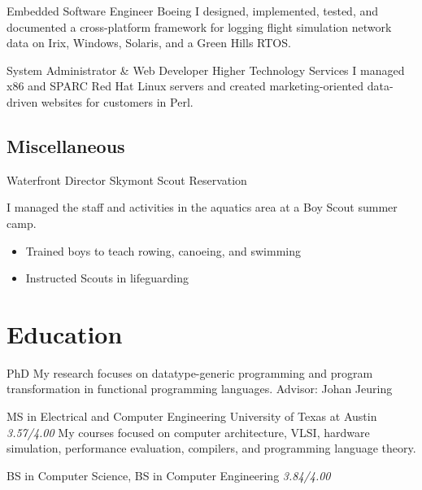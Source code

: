 \documentclass[11pt,a4paper,roman]{moderncv}
\begin{document}
\professionentry%
{}%
{Embedded Software Engineer}%
{Boeing}%
{\stlouis}%
{}%
{I designed, implemented, tested, and documented a cross-platform \cpplang{} framework for logging flight simulation network data on Irix, Windows, Solaris, and a Green Hills RTOS.}

\professionentry%
{}%
{System Administrator \& Web Developer}%
{Higher Technology Services}%
{\chattanooga}%
{}%
{I managed x86 and SPARC Red Hat Linux servers and created marketing-oriented data-driven websites for customers in Perl.}


\subsection{Miscellaneous}

\professionentry%
{}%
{Waterfront Director}%
{Skymont Scout Reservation}%
{\altamont}%
{}%
{I managed the staff and activities in the aquatics area at a Boy Scout summer camp.
\begin{itemize}[leftmargin=2em,nosep]
\item Trained boys to teach rowing, canoeing, and swimming
\item Instructed Scouts in lifeguarding
\end{itemize}}


\section{Education}

\educationentry%
{}%
{PhD}%
{\uu}%
{\utrecht}%
{My research focuses on datatype-generic programming and program transformation
in functional programming languages.\newline{}%
Advisor: Johan Jeuring}

\educationentrygpa%
{}%
{MS in Electrical and Computer Engineering}%
{University of Texas at Austin}%
{\austin}%
{\textit{3.57/4.00}}%
{My courses focused on computer architecture, VLSI, hardware simulation,
performance evaluation, compilers, and programming language theory.}

\educationentrygpa%
{}%
{BS in Computer Science, BS in Computer Engineering}%
{\wustl}%
{\stlouis}%
{\textit{3.84/4.00}}%
{}
\end{document}
